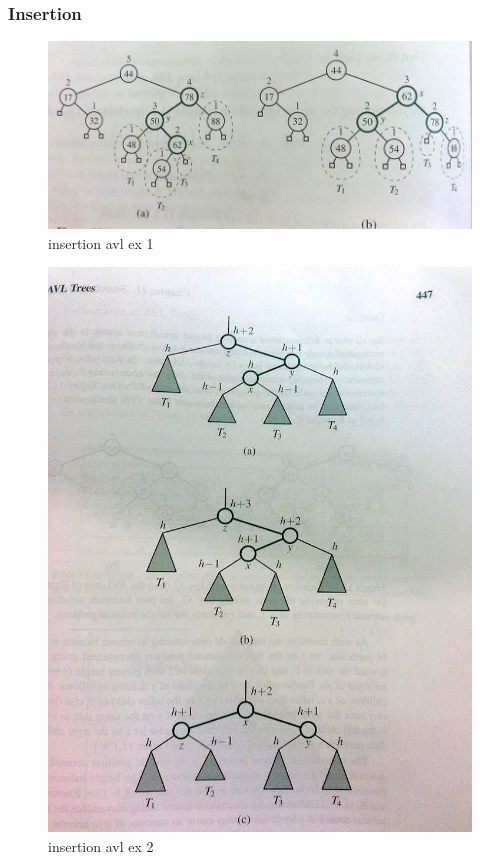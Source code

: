 \documentclass[a4paper]{article}
\begin{document}
\subsubsection{Insertion}
\begin{figure}[!h]
\begin{center}
\includegraphics[scale=0.4]{insertionavl1.jpg}
\caption{insertion avl ex 1}
\end{center}
\end{figure}
\begin{figure}[!h]
\begin{center}
\includegraphics[scale=0.4]{insertionavl2.jpg}
\caption{insertion avl ex 2}
\end{center}
\end{figure}
\end{document}
